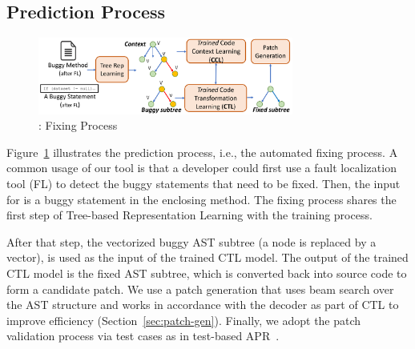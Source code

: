 \subsection{Prediction Process}

\begin{figure}[t]
	\centering
	\includegraphics[width=3.3in]{graphs/overview-predict-4.png}
	\caption{{\tool}: Fixing Process}
        \vspace{-3pt}
	\label{overview-fixing}
\end{figure}

Figure~\ref{overview-fixing} illustrates the prediction process, i.e.,
the automated fixing process. A common usage of our tool is that
a developer could first use a fault localization tool
(FL) to detect the buggy statements that need to be fixed. Then, the
input for {\tool} is a buggy statement in the enclosing method.
The fixing process shares the first step of Tree-based Representation
Learning with the training process.

After that step, the vectorized buggy AST subtree (a node is replaced
by a vector), is used as the input of the trained CTL model. The
output of the trained CTL model is the fixed AST subtree, which is
converted back into source code to form a candidate patch. We use a
patch generation that uses beam search over the AST structure and
works in accordance with the decoder as part of CTL to improve
efficiency (Section~\ref{sec:patch-gen}). Finally, we adopt the patch
validation process via test cases as in test-based APR~\cite{icse20}.




